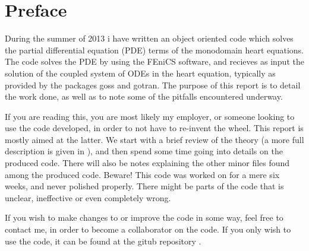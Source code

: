 \section*{Preface}
 During the summer of 2013 i have written an object oriented code which solves the partial differential equation (PDE) terms of the monodomain heart equations. The code solves the PDE by using the FEniCS software\cite{FEniCS}, and recieves as input the solution of the coupled system of ODEs in the heart equation, typically as provided by the packages goss\cite{goss} and gotran\cite{gotran}. The purpose of this report is to detail the work done, as well as to note some of the pitfalls encountered underway. 
 
 If you are reading this, you are most likely my employer, or someone looking to use the code developed, in order to not have to re-invent the wheel. This report is mostly aimed at the latter. We start with a brief review of the theory (a more full description is given in \cite{Sundnes06}), and then spend some time going into details on the produced code. There will also be notes explaining the other minor files found among the produced code. Beware! This code was worked on for a mere six weeks, and never polished properly. There might be parts of the code that is unclear, ineffective or even completely wrong. 
 
 If you wish to make changes to or improve the code in some way, feel free to contact me, in order to become a collaborator on the code. If you only wish to use the code, it can be found at the gitub repository \cite{source}. 